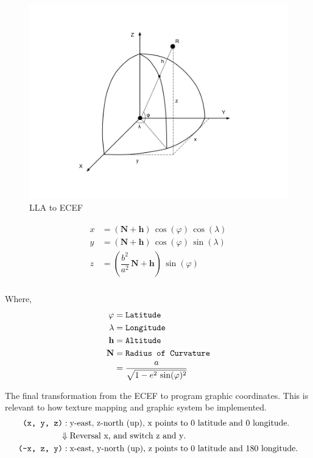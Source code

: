 \begin{figure}[H]
\caption{LLA to ECEF}
\label{fig:lla2ecef}
\centering
\includegraphics[width=\textwidth, keepaspectratio]{Figures/lla2ecef.png}
\decoRule
\end{figure}

\[
\begin{array}{lr}
\begin{aligned}
x &= (\mathbf{N} + \mathbf{h})\,\cos(\varphi)\,\cos(\lambda)\\
y &= (\mathbf{N} + \mathbf{h})\,\cos(\varphi)\,\sin(\lambda)\\
z &= (\dfrac{b^2}{a^2}\,\mathbf{N} + \mathbf{h})\,\sin(\varphi)\\
\end{aligned}
\end{array}
\]

Where,
\[
\begin{array}{lr}
\begin{aligned}
\varphi &= \texttt{Latitude}\\
\lambda &= \texttt{Longitude}\\
\mathbf{h} &= \texttt{Altitude}\\
\mathbf{N} &= \texttt{Radius of Curvature}\\
&= \dfrac{a}{\sqrt{1 - e^2\,\sin(\varphi)^2}}\\
\end{aligned}
\end{array}
\]

The final transformation from the ECEF to program graphic coordinates. This is relevant to how texture mapping and graphic system be implemented.
\[
\begin{array}{lr}
\begin{aligned}
\texttt{(x, y, z)}:\;&\text{y-east, z-north (up), x points to $0$ latitude and $0$ longitude}.\\
\Downarrow\;&\text{Reversal x, and switch z and y}.\\
\texttt{(-x, z, y)}:\;&\text{x-east, y-north (up), z points to $0$ latitude and $180$ longitude}.\\
\end{aligned}
\end{array}
\]


